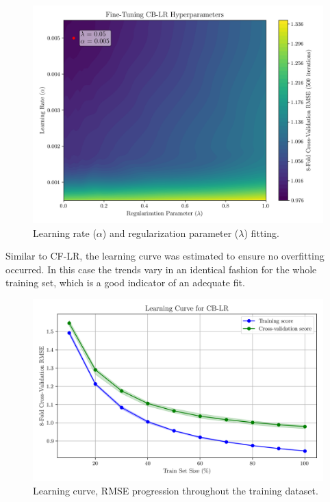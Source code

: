 \documentclass[conference]{IEEEtran}
\begin{document}
\begin{figure}[H]
    \centering
    \includegraphics[width=1\linewidth]{assets/model02_hyperparemeterstunning.png}
    \caption{Learning rate ($\alpha$) and regularization parameter ($\lambda$) fitting.}    \label{fig:model02_hyperparemeterstunning}
\end{figure}




Similar to CF-LR, the learning curve was estimated to ensure no overfitting occurred. In this case the trends vary in an identical fashion for the whole training set, which is a good indicator of an adequate fit. 

\begin{figure}[H]
    \centering
    \includegraphics[width=1\linewidth]{assets/model02_learning_curve.png}
    \caption{Learning curve, RMSE progression throughout the training dataset.}
    \label{fig:model02_learning_curve}
\end{figure}
\end{document}
